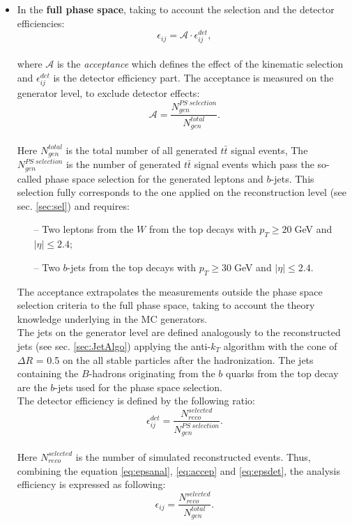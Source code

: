 \begin{itemize}
 \item In the \textbf{full phase space}, taking to account the selection and the detector efficiencies:
 \begin{equation}\label{eq:epsanal}
  \epsilon_{ij} = \mathcal{A} \cdot \epsilon_{ij}^{det},
 \end{equation}
 \\
 where $\mathcal{A}$ is the \textit{acceptance} which defines the effect of the kinematic selection and $\epsilon_{ij}^{det}$ is the detector efficiency part.
 The acceptance is measured on the generator level, to exclude detector effects:
 \\
 \begin{equation}\label{eq:accep}
  \mathcal{A} = \frac{N^{PS\;selection}_{gen}}{N^{total}_{gen}}.
 \end{equation}
 \\
 Here $N^{total}_{gen}$ is the total number of all generated $t\bar{t}$ signal events,
 The $N_{gen}^{PS\;selection}$ is the number of generated $t\bar{t}$ signal events which pass the so-called phase space selection for the generated leptons and 
 $b$-jets. This selection fully corresponds to the one applied on the reconstruction level (see sec. \ref{sec:sel}) and requires:
 \begin{itemize}
  \item[--] Two leptons from the $W$ from the top decays with $p_{T} \geq 20\;$GeV and $|\eta| \leq 2.4$;
  \item[--] Two $b$-jets from the top decays with $p_{T} \geq 30\;$GeV and $|\eta| \leq 2.4$.
 \end{itemize}
 The acceptance extrapolates the measurements outside the phase space selection criteria to the full phase space, taking to account the theory knowledge underlying in the MC generators.
 \\
 The jets on the generator level are defined analogously to the reconstructed jets (see sec. \ref{sec:JetAlgo}) applying the anti-$k_{T}$ algorithm with the 
 cone of $\Delta R$ = 0.5 on the all stable particles after the hadronization. The jets containing the $B$-hadrons originating from the $b$ quarks from the
 top decay are the $b$-jets used for the phase space selection.
 \\
 The detector efficiency is defined by the following ratio:
 \\
 \begin{equation}\label{eq:epsdet}
  \epsilon_{ij}^{det} = \frac{N^{selected}_{reco}}{N^{PS\;selection}_{gen}}.
 \end{equation}
 \\
 Here $N^{selected}_{reco}$ is the number of simulated reconstructed events. Thus, combining the equation \ref{eq:epsanal}, \ref{eq:accep} and \ref{eq:epsdet},
 the analysis efficiency is expressed as following:
 \\
 \begin{equation}
  \epsilon_{ij} = \frac{N^{selected}_{reco}}{N^{total}_{gen}}.
 \end{equation}
 

\end{itemize}
